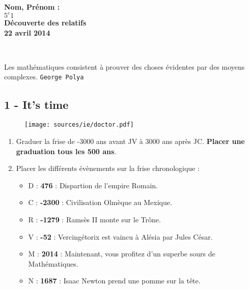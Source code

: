 \documentclass[11pt]{article}
\begin{document}

\begin{minipage}[t]{\textwidth}
\raggedright
{\bfseries Nom, Prénom : \underline{\phantom{123456789123456789}}}\\
{\bfseries $5^{e}1$}\\[.35ex]
\vspace*{-1cm}
\raggedleft
{\bfseries Découverte des relatifs}\\[.35ex]
{\bfseries 22 avril 2014}\\[.35ex]
\end{minipage}\\[1em]

\begin{center}
  \textsf{Les mathématiques consistent à prouver des choses évidentes par des moyens complexes.}
  \texttt{George Polya}\\
\end{center}

\vspace{-1cm}
\subsection*{1 - It's time}


\begin{figure}[H]
  \centering
  \texttt{[image: sources/ie/doctor.pdf]}
\end{figure}

\begin{enumerate}
\item[1] Graduer la frise de -3000 ans avant JV à 3000 ans après JC. \textbf{Placer une graduation tous les 500 ans}.
\item[2] Placer les différents évènements sur la frise chronologique :
\begin{multicols}{2}
  \begin{itemize}
  \item D : \textbf{476} : Dispartion de l'empire Romain.
  \item C : \textbf{-2300} : Civilisation Olmèque au Mexique.
  \item R : \textbf{-1279} : Ramsès II monte sur le Trône.	  
  \item V : \textbf{-52} : Vercingétorix est vaincu à Alésia par Jules César.
  \item M : \textbf{2014} : Maintenant, vous profitez d'un superbe sours de Mathématiques.
  \item N : \textbf{1687} : Isaac Newton prend une pomme sur la tête.
  \end{itemize}
\end{multicols}  
\end{enumerate}
\end{document}
